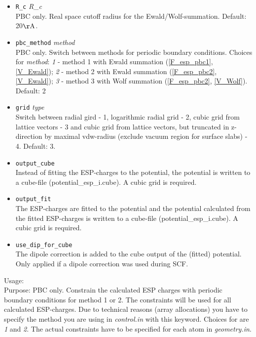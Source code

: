 \begin{itemize}
  PBC only. Maximum number \textit{k\_m} of multiples of the reciprocal lattice vectors that are used in the reciprocal space sum of the Ewald summation. 
  Default: 7
\item {} \texttt{R\_c} \textit{R\_c} \\
  PBC only. Real space cutoff radius for the Ewald/Wolf-summation. Default: 20$\mathrm{\AA}$.
\item {} \texttt{pbc\_method} \textit{method} \\
  PBC only. Switch between methods for periodic boundary conditions. Choices for \textit{method}: \textit{1} - method 1 
  with Ewald summation (\ref{F_esp_pbc1}, \ref{V_Ewald}); \textit{2} - method 2 with Ewald summation (\ref{F_esp_pbc2}, 
  \ref{V_Ewald});   \textit{3} - method 3 with Wolf summation (\ref{F_esp_pbc2}, \ref{V_Wolf}). Default: 2
\item {} \texttt{grid} \textit{type}\\
  Switch between radial gird - 1, logarithmic radial grid - 2, cubic grid from lattice vectors - 3 and cubic grid from lattice vectors, but truncated in z-direction by maximal vdw-radius (exclude vacuum region for surface slabs) - 4. Default: 3. 
\item {} \texttt{output\_cube}\\
  Instead of fitting the ESP-charges to the potential, the potential is written to a cube-file (potential\_esp\_i.cube).  A cubic grid is required.
\item {} \texttt{output\_fit}\\
  The ESP-charges are fitted to the potential and the potential calculated from the fitted ESP-charges is written to a cube-file (potential\_esp\_i.cube). A cubic grid is required.
\item {} \texttt{use\_dip\_for\_cube}\\
  The dipole correction is added to the cube output of the (fitted) potential. Only applied if a dipole correction was used during SCF. 

  \end{itemize}
{
  \noindent
  Usage:  \\[1.0ex]
  Purpose: PBC only. Constrain the calculated ESP charges with periodic boundary conditions for method 1 or 2. The constraints 
  will be used for all calculated ESP-charges. Due to technical reasons (array allocations) you have to specify the method 
  you are using in \textit{control.in} with this keyword. Choices for  are \textit{1} and \textit{2}. The actual 
  constraints have to be specified for each atom in \textit{geometry.in}.\\[1.0ex]
}
